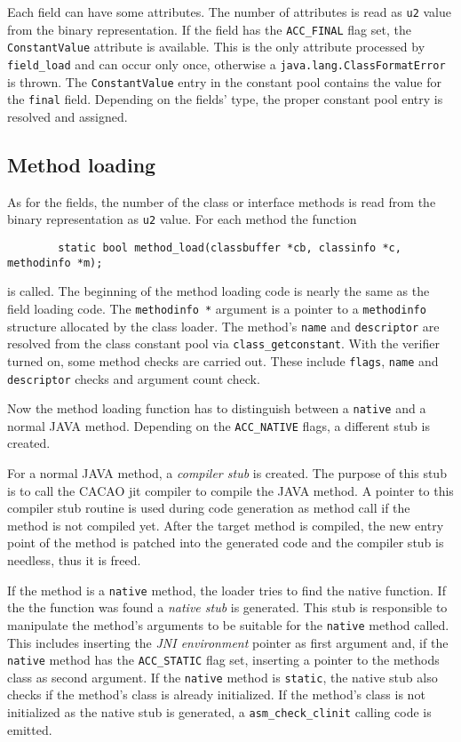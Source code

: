 Each field can have some attributes. The number of attributes is read
as \texttt{u2} value from the binary representation. If the field has
the \texttt{ACC\_FINAL} flag set, the \texttt{ConstantValue} attribute
is available. This is the only attribute processed by
\texttt{field\_load} and can occur only once, otherwise a
\texttt{java.lang.ClassFormatError} is thrown. The
\texttt{ConstantValue} entry in the constant pool contains the value
for the \texttt{final} field. Depending on the fields' type, the
proper constant pool entry is resolved and assigned.


\subsection{Method loading}

As for the fields, the number of the class or interface methods is read from
the binary representation as \texttt{u2} value. For each method the function

\begin{verbatim}
        static bool method_load(classbuffer *cb, classinfo *c, methodinfo *m);
\end{verbatim}

is called. The beginning of the method loading code is nearly the same
as the field loading code. The \texttt{methodinfo *} argument is a
pointer to a \texttt{methodinfo} structure allocated by the class
loader. The method's \texttt{name} and \texttt{descriptor} are
resolved from the class constant pool via
\texttt{class\_getconstant}. With the verifier turned on, some method
checks are carried out. These include \texttt{flags}, \texttt{name}
and \texttt{descriptor} checks and argument count check.

Now the method loading function has to distinguish between a
\texttt{native} and a normal JAVA method. Depending on the
\texttt{ACC\_NATIVE} flags, a different stub is created.

For a normal JAVA method, a \textit{compiler stub} is created. The
purpose of this stub is to call the CACAO jit compiler to compile the
JAVA method. A pointer to this compiler stub routine is used during
code generation as method call if the method is not compiled
yet. After the target method is compiled, the new entry point of the
method is patched into the generated code and the compiler stub is
needless, thus it is freed.

If the method is a \texttt{native} method, the loader tries to find
the native function. If the the function was found a \textit{native
stub} is generated. This stub is responsible to manipulate the
method's arguments to be suitable for the \texttt{native} method
called. This includes inserting the \textit{JNI environment} pointer
as first argument and, if the \texttt{native} method has the
\texttt{ACC\_STATIC} flag set, inserting a pointer to the methods
class as second argument. If the \texttt{native} method is
\texttt{static}, the native stub also checks if the method's class is
already initialized. If the method's class is not initialized as the
native stub is generated, a \texttt{asm\_check\_clinit} calling code
is emitted.


